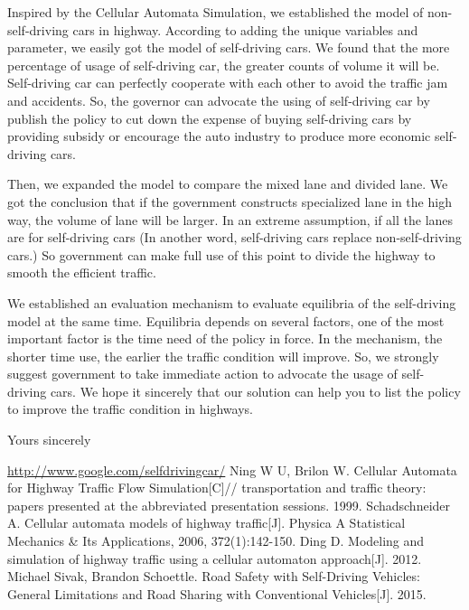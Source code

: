 \documentclass{mcmthesis}
\numberwithin{equation}{section}
\begin{document}
		Inspired by the Cellular Automata Simulation, we established the model of non-self-driving cars in highway. According to adding the unique variables and parameter, we easily got the model of self-driving cars. We found that the more percentage of usage of self-driving car, the greater counts of volume it will be. Self-driving car can perfectly cooperate with each other to avoid the traffic jam and accidents. So, the governor can advocate the using of self-driving car by publish the policy to cut down the expense of buying self-driving cars by providing subsidy or encourage the auto industry to produce more economic self-driving cars.

		Then, we expanded the model to compare the mixed lane and divided lane. We got the conclusion that if the government constructs specialized lane in the high way, the volume of lane will be larger. In an extreme assumption, if all the lanes are for self-driving cars (In another word, self-driving cars replace non-self-driving cars.) So government can make full use of this point to divide the highway to smooth the efficient traffic.

		We established an evaluation mechanism to evaluate equilibria of the self-driving model at the same time. Equilibria depends on several factors, one of the most important factor is the time need of the policy in force. In the mechanism, the shorter time use, the earlier the traffic condition will improve. So, we strongly suggest government to take immediate action to advocate the usage of self-driving cars.
		We hope it sincerely that our solution can help you to list the policy to improve the traffic condition in highways.
		\begin{flushright}
		Yours sincerely
		\end{flushright}

	\newpage
	\begin{thebibliography}{99}
		\url{http://www.google.com/selfdrivingcar/}
		Ning W U, Brilon W. Cellular Automata for Highway Traffic Flow Simulation[C]// transportation and traffic theory: papers presented at the abbreviated presentation sessions. 1999.
		Schadschneider A. Cellular automata models of highway traffic[J]. Physica A Statistical Mechanics \& Its Applications, 2006, 372(1):142-150.
		Ding D. Modeling and simulation of highway traffic using a cellular automaton approach[J]. 2012.
		Michael Sivak, Brandon Schoettle. Road Safety with Self-Driving Vehicles: General Limitations and Road Sharing with Conventional Vehicles[J]. 2015.
	\end{thebibliography}
\end{document}
